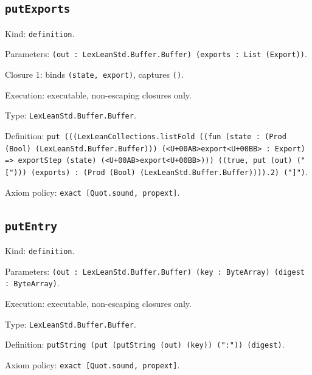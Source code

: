 \documentclass[11pt]{article}
\begin{document}
\subsection*{\texttt{putExports}}
\noindent Kind: \texttt{definition}.\par
\noindent Parameters: \texttt{(out : LexLeanStd.Buffer.Buffer) (exports : List (Export))}.\par
\noindent Closure 1: binds \texttt{(state, export)}, captures \texttt{()}.\par
\noindent Execution: executable, non-escaping closures only.\par
\noindent Type: \texttt{LexLeanStd.Buffer.Buffer}.\par
\noindent Definition: \texttt{put (((LexLeanCollections.listFold ((fun (state : (Prod (Bool) (LexLeanStd.Buffer.Buffer))) (<U+00AB>export<U+00BB> : Export) => exportStep (state) (<U+00AB>export<U+00BB>))) ((true, put (out) ("["))) (exports) : (Prod (Bool) (LexLeanStd.Buffer.Buffer)))).2) ("]")}.\par
\noindent Axiom policy: \texttt{exact [Quot.sound, propext]}.\par
\subsection*{\texttt{putEntry}}
\noindent Kind: \texttt{definition}.\par
\noindent Parameters: \texttt{(out : LexLeanStd.Buffer.Buffer) (key : ByteArray) (digest : ByteArray)}.\par
\noindent Execution: executable, non-escaping closures only.\par
\noindent Type: \texttt{LexLeanStd.Buffer.Buffer}.\par
\noindent Definition: \texttt{putString (put (putString (out) (key)) (":")) (digest)}.\par
\noindent Axiom policy: \texttt{exact [Quot.sound, propext]}.\par
\end{document}
